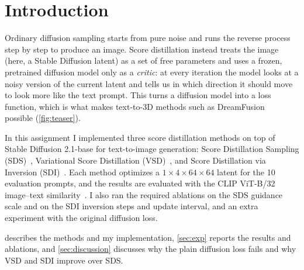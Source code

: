 \section{Introduction}
\label{sec:intro}

Ordinary diffusion sampling starts from pure noise and runs the reverse process step by step to produce an image.
Score distillation instead treats the image (here, a Stable Diffusion latent) as a set of free parameters and uses a frozen, pretrained diffusion model only as a \emph{critic}: at every iteration the model looks at a noisy version of the current latent and tells us in which direction it should move to look more like the text prompt.
This turns a diffusion model into a loss function, which is what makes text-to-3D methods such as DreamFusion~\cite{poole2023dreamfusion} possible (\cref{fig:teaser}).

In this assignment I implemented three score distillation methods on top of Stable Diffusion 2.1-base for text-to-image generation:
Score Distillation Sampling (SDS)~\cite{poole2023dreamfusion},
Variational Score Distillation (VSD)~\cite{wang2023prolificdreamer}, and
Score Distillation via Inversion (SDI)~\cite{lukoianov2024sdi}.
Each method optimizes a $1\times4\times64\times64$ latent for the 10 evaluation prompts, and the results are evaluated with the CLIP ViT-B/32 image--text similarity~\cite{radford2021clip}.
I also ran the required ablations on the SDS guidance scale and on the SDI inversion steps and update interval, and an extra experiment with the original diffusion loss.

 describes the methods and my implementation, \cref{sec:exp} reports the results and ablations, and \cref{sec:discussion} discusses why the plain diffusion loss fails and why VSD and SDI improve over SDS.
